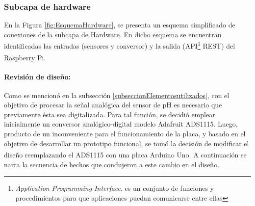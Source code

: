                 
            \subsubsection{Subcapa de hardware} 
               \par En la Figura \ref{fig:EsquemaHardware}, se presenta un esquema simplificado de conexiones de la subcapa de Hardware. En dicho esquema se encuentran identificadas las entradas (sensores y conversor) y la salida (API\footnote{\textit{Application Programming Interface}, es un conjunto de funciones y procedimientos para que aplicaciones puedan comunicarse entre ellas} REST) del Raspberry\textsuperscript{\textregistered} Pi.
                
                \paragraph{Revisión de diseño:}
                 
                 Como se mencionó en la subsección \ref{subseccionElementosutilizados}, con el objetivo de procesar la señal analógica del sensor de pH es necesario que previamente ésta sea digitalizada. Para tal función, se decidió emplear inicialmente un conversor analógico-digital modelo Adafruit ADS1115. Luego, producto de un inconveniente para el funcionamiento de la placa, y basado en el objetivo de desarrollar un prototipo funcional, se tomó la decisión de modificar el diseño reemplazando el ADS1115 con una placa Arduino\textsuperscript{\textregistered} Uno. A continuación se narra la secuencia de hechos que condujeron a este cambio en el diseño.
    
